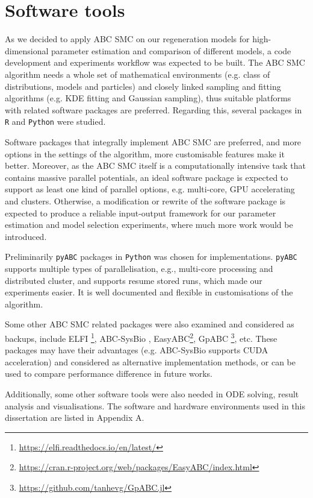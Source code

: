 \section{Software tools}



As we decided to apply ABC SMC on our regeneration models for high-dimensional parameter estimation and comparison of different models, a code development and experiments workflow was expected to be built. The ABC SMC algorithm needs a whole set of mathematical environments (e.g. class of distributions, models and particles) and closely linked sampling and fitting algorithms (e.g. KDE fitting and Gaussian sampling), thus suitable platforms with related software packages are preferred. Regarding this, several packages in \verb|R| and \verb|Python| were studied.

Software packages that integrally implement ABC SMC are preferred, and more options in the settings of the algorithm, more customisable features make it better. Moreover, as the ABC SMC itself is a computationally intensive task that contains massive parallel potentials, an ideal software package is expected to support as least one kind of parallel options, e.g. multi-core, GPU accelerating and clusters. Otherwise, a modification or rewrite of the software package is expected to produce a reliable input-output framework for our parameter estimation and model selection experiments, where much more work would be introduced.

Preliminarily \verb|pyABC| packages \cite{ref:pyabc} in \verb|Python| was chosen for implementations. \verb|pyABC| supports multiple types of parallelisation, e.g., multi-core processing and distributed cluster, and supports resume stored runs, which made our experiments easier. It is well documented and flexible in customisations of the algorithm.

Some other ABC SMC related packages were also examined and considered as backups, include ELFI \footnote{\url{https://elfi.readthedocs.io/en/latest/}}, ABC-SysBio \cite{ref:abcsysbio}, EasyABC\footnote{\url{https://cran.r-project.org/web/packages/EasyABC/index.html}}, GpABC \footnote{\url{https://github.com/tanhevg/GpABC.jl}}, etc. These packages may have their advantages (e.g. ABC-SysBio supports CUDA acceleration) and considered as alternative implementation methods, or can be used to compare performance difference in future works.

Additionally, some other software tools were also needed in ODE solving, result analysis and visualisations. The software and hardware environments used in this dissertation are listed in Appendix A.